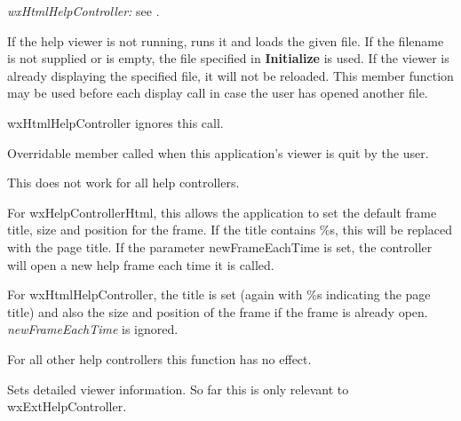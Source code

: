 {\it wxHtmlHelpController:} see .

\label{wxhelpcontrollerloadfile}


If the help viewer is not running, runs it and loads the given file.
If the filename is not supplied or is
empty, the file specified in {\bf Initialize} is used. If the viewer is
already displaying the specified file, it will not be reloaded. This
member function may be used before each display call in case the user
has opened another file.

wxHtmlHelpController ignores this call.

\label{wxhelpcontrolleronquit}


Overridable member called when this application's viewer is quit by the user.

This does not work for all help controllers.

\label{wxhelpcontrollersetframeparameters}


For wxHelpControllerHtml, this allows the application to set the
default frame title, size and position for the frame. If the title
contains \%s, this will be replaced with the page title. If the
parameter newFrameEachTime is set, the controller will open a new
help frame each time it is called.

For wxHtmlHelpController, the title is set (again with \%s indicating the
page title) and also the size and position of the frame if the frame is already
open. {\it newFrameEachTime} is ignored.

For all other help controllers this function has no effect.

\label{wxhelpcontrollersetviewer}


Sets detailed viewer information. So far this is only relevant to wxExtHelpController.

